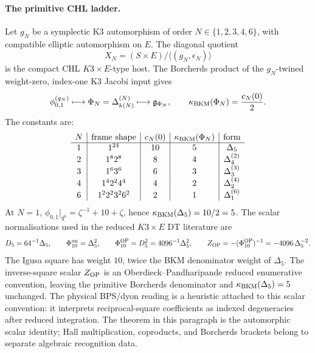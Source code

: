 \paragraph{The primitive CHL ladder.}
Let \(g_N\) be a symplectic K3 automorphism of order
\(N\in\{1,2,3,4,6\}\), with compatible elliptic automorphism on \(E\).
The diagonal quotient
\[
  X_N=(S\times E)/\langle(g_N,\epsilon_N)\rangle
\]
is the compact CHL \(K3\times E\)-type host.  The Borcherds product of
the \(g_N\)-twined weight-zero, index-one K3 Jacobi input gives
\[
  \phi_{0,1}^{(g_N)}
  \longmapsto
  \Phi_N=\Delta_{k(N)}^{(N)}
  \longmapsto
  \mathfrak{g}_{\Phi_N},
  \qquad
  \kappa_{\mathrm{BKM}}(\Phi_N)=\frac{c_N(0)}{2}.
\]
The constants are:
\[
\begin{array}{c|c|c|c|c}
N & \text{frame shape} & c_N(0) & \kappa_{\mathrm{BKM}}(\Phi_N) & \text{form} \\ \hline
1 & 1^{24} & 10 & 5 & \Delta_5 \\
2 & 1^8 2^8 & 8 & 4 & \Delta_4^{(2)} \\
3 & 1^6 3^6 & 6 & 3 & \Delta_3^{(3)} \\
4 & 1^4 2^2 4^4 & 4 & 2 & \Delta_2^{(4)} \\
6 & 1^2 2^2 3^2 6^2 & 2 & 1 & \Delta_1^{(6)}
\end{array}
\]
At \(N=1\),
\(\phi_{0,1}|_{q^0}=\zeta^{-1}+10+\zeta\), hence
\(\kappa_{\mathrm{BKM}}(\Delta_5)=10/2=5\).  The scalar normalisations used in the
reduced \(K3\times E\) DT literature are
\[
  D_5=64^{-1}\Delta_5,\qquad
  \Phi_{10}^{\mathrm{un}}=\Delta_5^2,\qquad
  \Phi_{10}^{\mathrm{OP}}=D_5^2=4096^{-1}\Delta_5^2,
  \qquad
  Z_{\mathrm{OP}}=-(\Phi_{10}^{\mathrm{OP}})^{-1}
       =-4096\,\Delta_5^{-2}.
\]
The Igusa square has weight \(10\), twice the BKM denominator weight of
\(\Delta_5\).  The inverse-square scalar \(Z_{\mathrm{OP}}\) is an
Oberdieck--Pandharipande reduced enumerative convention, leaving the
primitive Borcherds denominator and \(\kappa_{\mathrm{BKM}}(\Delta_5)=5\) unchanged.
The physical BPS/dyon reading is a heuristic attached to this scalar
convention: it interprets reciprocal-square coefficients as indexed
degeneracies after reduced integration.  The theorem in this paragraph
is the automorphic scalar identity; Hall multiplication, coproducts, and
Borcherds brackets belong to separate algebraic recognition data.

